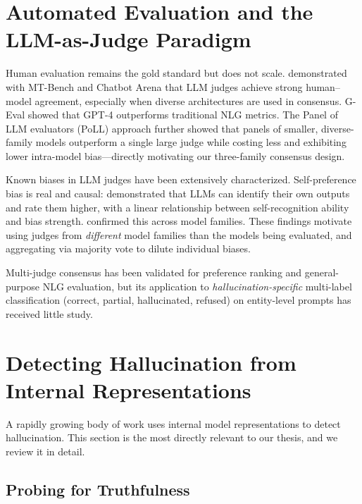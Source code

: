 \section{Automated Evaluation and the LLM-as-Judge Paradigm}
\label{sec:lit-judge}

Human evaluation remains the gold standard but does not scale.  \citet{zheng2023judging} demonstrated with MT-Bench and Chatbot Arena that LLM judges achieve strong human--model agreement, especially when diverse architectures are used in consensus.  G-Eval \citep{liu2023geval} showed that GPT-4 outperforms traditional NLG metrics.  The Panel of LLM evaluators (PoLL) approach \citep{verga2024replacing} further showed that panels of smaller, diverse-family models outperform a single large judge while costing less and exhibiting lower intra-model bias---directly motivating our three-family consensus design.

Known biases in LLM judges have been extensively characterized.  Self-preference bias is real and causal: \citet{panickssery2024llm} demonstrated that LLMs can identify their own outputs and rate them higher, with a linear relationship between self-recognition ability and bias strength.  \citet{wataoka2024selfpreference} confirmed this across model families.  These findings motivate using judges from \emph{different} model families than the models being evaluated, and aggregating via majority vote to dilute individual biases.

Multi-judge consensus has been validated for preference ranking and general-purpose NLG evaluation, but its application to \emph{hallucination-specific} multi-label classification (correct, partial, hallucinated, refused) on entity-level prompts has received little study.


\section{Detecting Hallucination from Internal Representations}
\label{sec:lit-detection}

A rapidly growing body of work uses internal model representations to detect hallucination.  This section is the most directly relevant to our thesis, and we review it in detail.

\subsection{Probing for Truthfulness}

